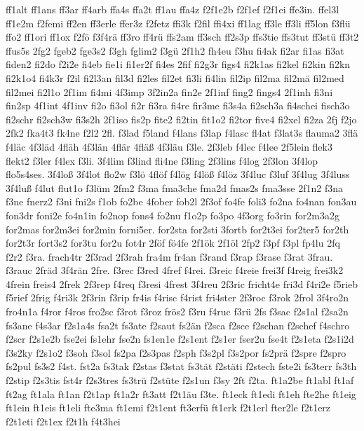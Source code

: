 {ff1alt
ff1ans
ff3ar
ff4arb
ffa4s
ffa2t
ff1au
ffa4z
f2f1e2b
f2f1ef
f2f1ei
ffe3in.
ffel3l
ff1e2m
f2femi
ff2en
ff3erle
ffer3z
f2fetz
ffi3k
f2fil
ffi4xi
ff1lag
ff3le
ff3li
ff5lon
f3flü
ffo2
ff1ori
ff1ox
f2fö
f3f4rä
ff3ro
ff4rü
ffs2am
ff3sch
ff2s3p
ffs3tie
ffs3tut
ff3stü
ff3t2
ffus5s
2fg2
fgeb2
fge3s2
f3gh
fglim2
f3gü
2f1h2
fh4eu
f3hu
fi4ak
fi2ar
fi1as
fi3at
fiden2
fi2do
f2i2e
fi4eb
fie1i
fi1er2f
fi4es
2fif
fi2g3r
figs4
fi2k1as
fi2kel
fi2kin
fi2kn
fi2k1o4
fi4k3r
f2il
fi2l3an
fil3d
fi2les
fil2et
fi3li
fi4lin
fil2ip
fil2ma
fil2mä
fil2med
fil2mei
fi2l1o
2f1im
fi4mi
4f3imp
3f2in2a
fin2e
2f1inf
fing2
fings4
2f1inh
fi3ni
fin2sp
4f1int
4f1inv
fi2o
fi3ol
fi2r
fi3ra
fi4re
fir3me
fi3s4a
fi2sch3a
fi4schei
fisch3o
fi2schr
fi2sch3w
fi3s2h
2f1iso
fis2p
fite2
fi2tin
fit1o2
fi2tor
five4
fi2xel
fi2za
2fj
f2jo
2fk2
fka4t3
fk4ne
f2l2
2fl.
f3lad
f5land
f4lans
f3lap
f4lasc
fl4at
f3lat3s
flauma2
3flä
f4läc
4f3läd
4fläh
4f3län
4flär
4fläß
4f3läu
f3le.
2f3leb
f4lec
f4lee
2f5lein
flek3
flekt2
f3ler
f4lex
f3li.
3f4lim
f3lind
fli4ne
f3ling
2f3lins
f4log
2f3lon
3f4lop
flo5s4ses.
3f4loß
3f4lot
flo2w
f3lö
4flöf
f4lög
f4löß
f4löz
3f4luc
f3luf
3f4lug
3f4luss
3f4luß
f4lut
flut1o
f3lüm
2fm2
f3ma
fma3che
fma2d
fmas2s
fma3sse
2f1n2
f3na
f3ne
fnerz2
f3ni
fni2s
f1ob
fo2be
4fober
fob2l
2f3of
fo4fe
foli3
fo2na
fo4nan
fon3au
fon3dr
foni2e
fo4n1in
fo2nop
fons4
fo2nu
f1o2p
fo3po
4f3org
fo3rin
for2m3a2g
for2mas
for2m3ei
for2min
forni5er.
for2sta
for2sti
3fortb
for2t3ei
for2ter5
for2th
for2t3r
fort3s2
for3tu
for2u
fot4r
2föf
fö4fe
2f1ök
2f1öl
2fp2
f3pf
f3pl
fp4lu
2fq
f2r2
f3ra.
frach4tr
2f3rad
2f3rah
fra4m
fr4an
f3rand
f3rap
f3rase
f3rat
3frau.
f3rauc
2fräd
3f4rän
2fre.
f3rec
f3red
4fref
f4rei.
f3reic
f4reie
frei3f
f4reig
frei3k2
4frein
freis4
2frek
2f3rep
f4req
f3resi
4frest
3f4reu
2f3ric
fricht4e
fri3d
f4ri2e
f5rieb
f5rief
2frig
f4ri3k
2f3rin
f3rip
fr4is
f4risc
f4rist
fri4ster
2f3roc
f3rok
2frol
3f4ro2n
fro4n1a
f4ror
f4ros
fro2sc
f3rot
f3roz
frös2
f3ru
f4ruc
f3rü
2fs
f3sac
f2s1al
f2sa2n
fs3ane
f4s3ar
f2s1a4s
fsa2t
fs3ate
f2saut
fs2än
f2sca
f2sce
f2schan
f2schef
f4schro
f2scr
f2s1e2b
fse2ei
fs1ehr
fse2n
fs1en1e
f2s1ent
f2s1er
fser2u
fse4t
f2s1eta
f2s1i2d
f3s2ky
f2s1o2
f3soh
f3sol
fs2pa
f2s3pas
f2sph
f3s2pl
f3s2por
fs2prä
f2spre
f2spro
fs2pul
fs3s2
f4st.
fst2a
fs3tak
f2stas
f3stat
fs3tät
f2stäti
f2stech
fste2i
fs3terr
fs3th
f2stip
f2s3tis
fst4r
f2s3tres
fs3trü
f2stüte
f2s1un
f3sy
2ft
f2ta.
ft1a2be
ft1abl
ft1af
ft2ag
ft1ala
ft1an
f2t1ap
ft1a2r
ft3att
f2t1äu
f3te.
ft1eck
ft1edi
ft1eh
fte2he
ft1eig
ft1ein
ft1eis
ft1eli
fte3ma
ft1emi
f2t1ent
ft3erfü
ft1erk
f2t1erl
fter2le
f2t1erz
f2t1eti
f2t1ex
f2t1h
f4t3hei
}
